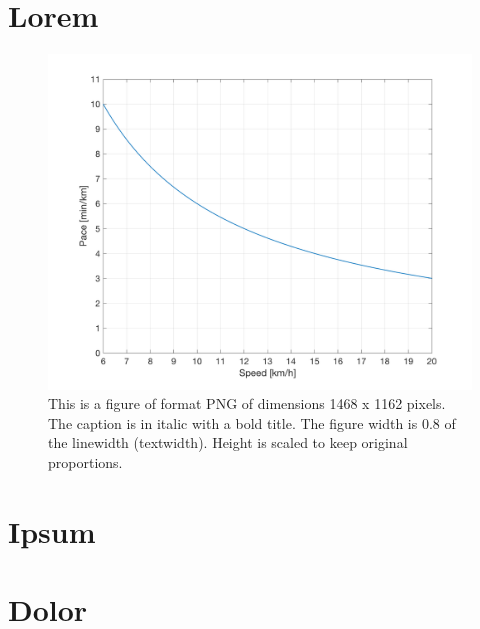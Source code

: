 \begin{appendices}
    \section{Lorem}
    \begin{figure}[H]
    	\centering
    	\includegraphics[width=0.8\linewidth]{Figures/PacevsSpeed.png}
    	\caption{This is a figure of format PNG of dimensions 1468 x 1162 pixels. The caption is in italic with a bold title. The figure width is 0.8 of the linewidth (textwidth). Height is scaled to keep original proportions.}
    	\label{Fig:}
    \end{figure}
    \section{Ipsum}
    \lipsum[2]
    \section{Dolor}
    \lipsum[3]
\end{appendices}


